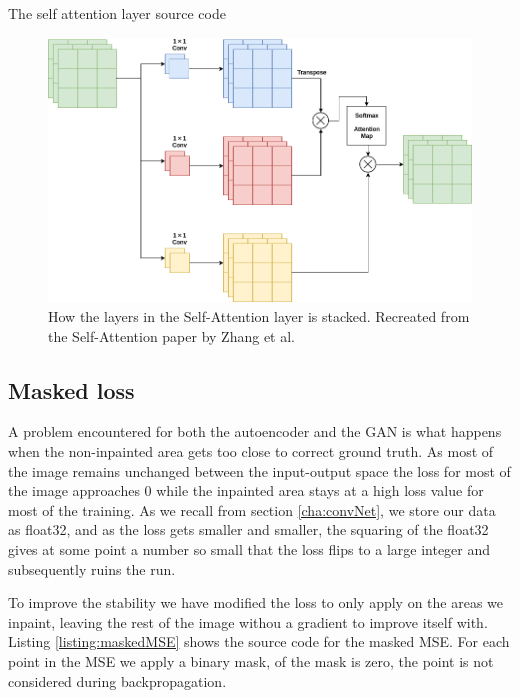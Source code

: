 \begin{minipage}{\linewidth}
\begin{listing}

\caption{The self attention layer source code}
\label{listing:Attention}
\end{listing}
\end{minipage}

\begin{figure}[h]
\centering
\includegraphics[scale=0.4]{methodology/figures/attention.png}
\caption{How the layers in the Self-Attention layer is stacked. Recreated from the Self-Attention  paper by Zhang et al.~\cite{DBLP:journals/corr/selfattention}}
\label{fig:Attention}
\end{figure}



\subsection{Masked loss}
A problem encountered for both the autoencoder and the GAN is what happens when the non-inpainted area gets too close to correct ground truth. 
As most of the image remains unchanged between the input-output space the loss for most of the image approaches 0 while the inpainted area stays at a high loss value for most of the training. 
As we recall from section \ref{cha:convNet}, we store our data as float32, and as the loss gets smaller and smaller, the squaring of the float32 gives at some point a number so small that the loss flips to a large integer and subsequently ruins the run. 



To improve the stability we have modified the loss to only apply on the areas we inpaint, leaving the rest of the image withou a gradient to improve itself with.
Listing \ref{listing:maskedMSE} shows the source code for the masked MSE. 
For each point in the MSE we apply a binary mask, of the mask is zero, the point is not considered during backpropagation.


